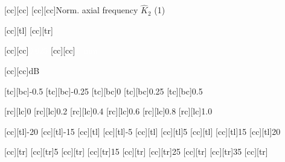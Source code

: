 [cc][cc]{\tiny {}}
[cc][cc]{\tiny Norm. axial frequency $\hat{K}_{2}$ (1)}

[cc][tl]{\tiny {}}
[cc][tr]{\tiny {}}

[cc][cc]{\footnotesize \textcolor{white}{$0.025$}}
[cc][cc]{\footnotesize \textcolor{white}{\SI{1}{\milli\meter}}}

[cc][cc]{\footnotesize \si{\deci\bel}}

[tc][bc]{\tiny -0.5}
[tc][bc]{\tiny -0.25}
[tc][bc]{\tiny 0}
[tc][bc]{\tiny 0.25}
[tc][bc]{\tiny 0.5}

[rc][lc]{\tiny 0}
[rc][lc]{\tiny 0.2}
[rc][lc]{\tiny 0.4}
[rc][lc]{\tiny 0.6}
[rc][lc]{\tiny 0.8}
[rc][lc]{\tiny 1.0}

[cc][tl]{\tiny -20}
[cc][tl]{\tiny -15}
[cc][tl]{\tiny}
[cc][tl]{\tiny -5}
[cc][tl]{\tiny}
[cc][tl]{\tiny 5}
[cc][tl]{\tiny}
[cc][tl]{\tiny 15}
[cc][tl]{\tiny 20}

[cc][tr]{\tiny}
[cc][tr]{\tiny 5}
[cc][tr]{\tiny}
[cc][tr]{\tiny 15}
[cc][tr]{\tiny}
[cc][tr]{\tiny 25}
[cc][tr]{\tiny}
[cc][tr]{\tiny 35}
[cc][tr]{\tiny}

